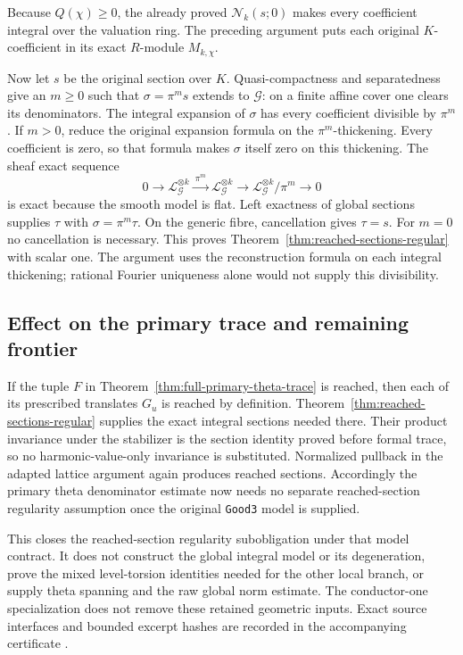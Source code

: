 Because $Q(\chi)\geq0$, the already proved $\mathcal N_k(s;0)$ makes
every coefficient integral over the valuation ring.  The preceding
argument puts each original $K$-coefficient in its exact $R$-module
$M_{k,\chi}$.

Now let $s$ be the original section over $K$.  Quasi-compactness and
separatedness give an $m\geq0$ such that $\sigma=\pi^m s$ extends to
$\mathcal G$: on a finite affine cover one clears its denominators.
The integral expansion of $\sigma$ has every coefficient divisible by
$\pi^m$.  If $m>0$, reduce the original expansion formula on the
$\pi^m$-thickening.  Every coefficient is zero, so that formula makes
$\sigma$ itself zero on this thickening.  The sheaf exact sequence
\[
 0\longrightarrow\mathscr L_{\mathcal G}^{\otimes k}
   \xrightarrow{\ \pi^m\ }
   \mathscr L_{\mathcal G}^{\otimes k}
   \longrightarrow
   \mathscr L_{\mathcal G}^{\otimes k}/\pi^m
   \longrightarrow0
\]
is exact because the smooth model is flat.  Left exactness of global
sections supplies $\tau$ with $\sigma=\pi^m\tau$.
On the generic fibre, cancellation gives $\tau=s$.  For $m=0$ no
cancellation is necessary.  This proves Theorem~\ref{thm:reached-sections-regular}
with scalar one.  The argument uses the reconstruction formula on
each integral thickening; rational Fourier uniqueness alone would
not supply this divisibility.

\subsection*{Effect on the primary trace and remaining frontier}

If the tuple $F$ in Theorem~\ref{thm:full-primary-theta-trace} is reached,
then each of its prescribed translates $G_u$ is reached by definition.
Theorem~\ref{thm:reached-sections-regular} supplies the exact integral
sections needed there.  Their product invariance under the stabilizer
is the section identity proved before formal trace, so no
harmonic-value-only invariance is substituted.  Normalized pullback
in the adapted lattice argument again produces reached sections.
Accordingly the primary theta denominator estimate now needs no
separate reached-section regularity assumption once the original
\texttt{Good3} model is supplied.

This closes the reached-section regularity subobligation under that
model contract.  It does not construct the global integral model or
its degeneration, prove the mixed level-torsion identities needed for
the other local branch, or supply theta spanning and the raw global
norm estimate.  The conductor-one specialization does not remove
these retained geometric inputs.  Exact source interfaces and bounded
excerpt hashes are recorded in the accompanying certificate
\cite{reached-regularity-source}.
